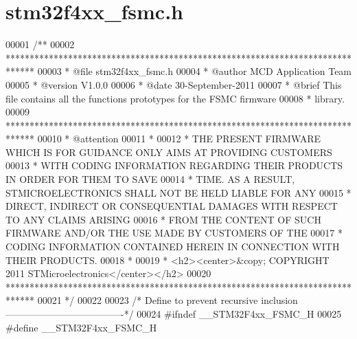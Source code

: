 \section{stm32f4xx\+\_\+fsmc.\+h}
\label{stm32f4xx__fsmc_8h_source}

\begin{DoxyCode}
00001 \textcolor{comment}{/**}
00002 \textcolor{comment}{  ******************************************************************************}
00003 \textcolor{comment}{  * @file    stm32f4xx\_fsmc.h}
00004 \textcolor{comment}{  * @author  MCD Application Team}
00005 \textcolor{comment}{  * @version V1.0.0}
00006 \textcolor{comment}{  * @date    30-September-2011}
00007 \textcolor{comment}{  * @brief   This file contains all the functions prototypes for the FSMC firmware }
00008 \textcolor{comment}{  *          library.}
00009 \textcolor{comment}{  ******************************************************************************}
00010 \textcolor{comment}{  * @attention}
00011 \textcolor{comment}{  *}
00012 \textcolor{comment}{  * THE PRESENT FIRMWARE WHICH IS FOR GUIDANCE ONLY AIMS AT PROVIDING CUSTOMERS}
00013 \textcolor{comment}{  * WITH CODING INFORMATION REGARDING THEIR PRODUCTS IN ORDER FOR THEM TO SAVE}
00014 \textcolor{comment}{  * TIME. AS A RESULT, STMICROELECTRONICS SHALL NOT BE HELD LIABLE FOR ANY}
00015 \textcolor{comment}{  * DIRECT, INDIRECT OR CONSEQUENTIAL DAMAGES WITH RESPECT TO ANY CLAIMS ARISING}
00016 \textcolor{comment}{  * FROM THE CONTENT OF SUCH FIRMWARE AND/OR THE USE MADE BY CUSTOMERS OF THE}
00017 \textcolor{comment}{  * CODING INFORMATION CONTAINED HEREIN IN CONNECTION WITH THEIR PRODUCTS.}
00018 \textcolor{comment}{  *}
00019 \textcolor{comment}{  * <h2><center>&copy; COPYRIGHT 2011 STMicroelectronics</center></h2>}
00020 \textcolor{comment}{  ******************************************************************************}
00021 \textcolor{comment}{  */}
00022 
00023 \textcolor{comment}{/* Define to prevent recursive inclusion -------------------------------------*/}
00024 \textcolor{preprocessor}{#}\textcolor{preprocessor}{ifndef} \textcolor{preprocessor}{\_\_STM32F4xx\_FSMC\_H}
00025 \textcolor{preprocessor}{#}\textcolor{preprocessor}{define} \textcolor{preprocessor}{\_\_STM32F4xx\_FSMC\_H}

\end{DoxyCode}
